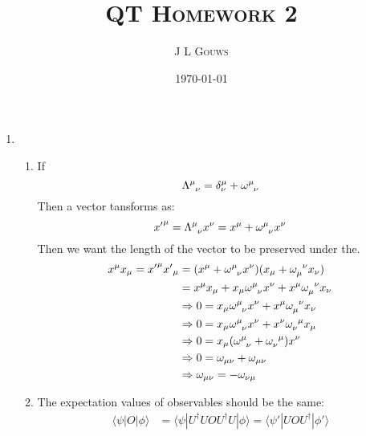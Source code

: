 \documentclass[12pt,a4]{article}
\title{
\textsc{QT Homework 2}
}
\author{\textsc{J L Gouws}
}
\date{\today
\\[1cm]}
\begin{document}
\thispagestyle{empty}

\maketitle


\begin{enumerate}
  \item
\begin{enumerate}
  \item
    If
    \begin{equation*}
      \tensor{\Lambda}{^{\mu}_\nu} = \delta^\mu_\nu + \tensor{\omega}{^\mu_\nu}
    \end{equation*}
    Then a vector tansforms as:
    \begin{equation*}
      {x'}^\mu = \tensor{\Lambda}{^{\mu}_\nu} x^\nu = x^\mu + \tensor{\omega}{^\mu_\nu} x^\nu
    \end{equation*}
    Then we want the length of the vector to be preserved under the.
    \begin{align*}
      {x}^\mu{x}_\mu = {x'}^\mu{x'}_\mu  &= (x^\mu + \tensor{\omega}{^\mu_\nu} x^\nu) (x_\mu + \tensor{\omega}{_\mu^\nu} x_\nu)\\
                                         &= x^\mu x_\mu + x_\mu \tensor{\omega}{^\mu_\nu} x^\nu + x^\mu \tensor{\omega}{_\mu^\nu} x_\nu\\
                                         &\Rightarrow 0 = x_\mu \tensor{\omega}{^\mu_\nu} x^\nu + x^\mu \tensor{\omega}{_\mu^\nu} x_\nu\\
                                         &\Rightarrow 0 = x_\mu \tensor{\omega}{^\mu_\nu} x^\nu + x^\nu \tensor{\omega}{_\nu^\mu} x_\mu\\
                                         &\Rightarrow 0 = x_\mu (\tensor{\omega}{^\mu_\nu} + \tensor{\omega}{_\nu^\mu}) x^\nu\\
                                         &\Rightarrow 0 = \omega_{\mu\nu} +  \omega_{\mu\nu}\\
                                         &\Rightarrow \omega_{\mu\nu} = -\omega_{\nu\mu}
    \end{align*}
  \item
    The expectation values of observables should be the same:
    \begin{align*}
      \langle \psi | O | \phi \rangle  &= \langle \psi | U^\dagger U O U^\dagger U | \phi \rangle = \langle \psi' |  U O U^\dagger | \phi' \rangle\\

\end{align*}
\end{enumerate}
\end{enumerate}
\end{document}
